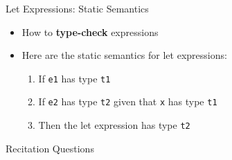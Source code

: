 \documentclass{beamer}
\begin{document}
    \begin{frame}{Let Expressions: Static Semantics}
        \begin{itemize}
            \item How to \textbf{type-check} expressions
            \item Here are the static semantics for let expressions:
            \begin{enumerate}
                \item If \texttt{e1} has type \texttt{t1}
                \item If \texttt{e2} has type \texttt{t2} given that \texttt{x} has type \texttt{t1}
                \item Then the let expression has type \texttt{t2}
            \end{enumerate}
        \end{itemize}    
    \end{frame}
    
    \begin{frame}{Recitation Questions}
    \end{frame}
\end{document}
